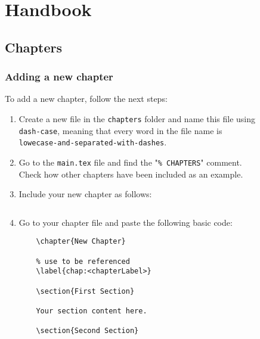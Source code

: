 \chapter{Handbook}
\label{chap:handbook}
 
\section{Chapters}

\subsection{Adding a new chapter}

To add a new chapter, follow the next steps:

\begin{enumerate}
  \item Create a new file in the \verb|chapters| folder and name this file using \\\verb|dash-case|, meaning that every word in the file name is\\\verb|lowecase-and-separated-with-dashes|.
  \item Go to the \verb|main.tex| file and find the "\verb|% CHAPTERS|" comment.\\Check how other chapters have been included as an example.
  \item Include your new chapter as follows:
  \begin{lstlisting}
    \end{lstlisting}
  \item Go to your chapter file and paste the following basic code:
  \begin{lstlisting}
    \chapter{New Chapter}

    % use to be referenced
    \label{chap:<chapterLabel>}
 
    \section{First Section}
    
    Your section content here.
    
    \section{Second Section}
    

\end{lstlisting}
\end{enumerate}
